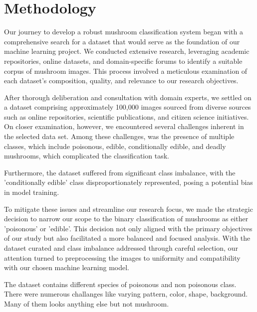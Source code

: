 \section{Methodology}

Our journey to develop a robust mushroom classification system began with a comprehensive search for a dataset that would serve as the foundation of our machine learning project. We conducted extensive research, leveraging academic repositories, online datasets, and domain-specific forums to identify a suitable corpus of mushroom images. This process involved a meticulous examination of each dataset's composition, quality, and relevance to our research objectives. 

After thorough deliberation and consultation with domain experts, we settled on a dataset comprising approximately 100,000 images sourced from diverse sources such as online repositories, scientific publications, and citizen science initiatives. On closer examination, however, we encountered several challenges inherent in the selected data set. Among these challenges, was the presence of multiple classes, which include poisonous, edible, conditionally edible, and deadly mushrooms, which complicated the classification task.

Furthermore, the dataset suffered from significant class imbalance, with the 'conditionally edible' class disproportionately represented, posing a potential bias in model training.

To mitigate these issues and streamline our research focus, we made the strategic decision to narrow our scope to the binary classification of mushrooms as either 'poisonous' or 'edible'. This decision not only aligned with the primary objectives of our study but also facilitated a more balanced and focused analysis. With the dataset curated and class imbalance addressed through careful selection, our attention turned to preprocessing the images to uniformity and compatibility with our chosen machine learning model. 

The dataset contains different species of poisonous and non poisonous class. There were numerous challanges like varying pattern, color, shape, background. Many of them looks anything else but not mushroom.


